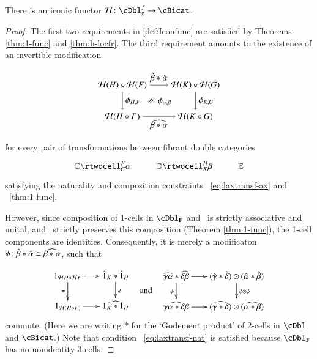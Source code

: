 \begin{thm}\label{thm:h-functor}
  There is an iconic functor $\cH\maps \cDbl^f_g\to \cBicat$.
\end{thm}
\begin{proof}
The first two requirements in \autoref{def:Iconfunc} are satisfied by Theorems \ref{thm:1-func} and \ref{thm:h-locfr}. The third requirement amounts to the existence of an invertible modification

\begin{equation}
\begin{tikzpicture}[xscale=0.75, yscale=1.3]
\node (tl) at (0,2) {${\cH}(H) \circ {\cH}(F)$};
\node (bl) at (0,1) {${\cH}(H \circ F)$};
\node (tr) at (4,2) {${\cH}(K) \circ {\cH}(G)$};
\node (br) at (4,1) {${\cH}(K \circ G)$};
\draw[->] (tl) to node [above] {$\hat{\beta} * \hat{\alpha}$} (tr);
\draw[->] (tr) to node [right] {$\phi_{K,G}$} (br);
\draw[->] (tl) to node [right] {$\phi_{H,F}$} (bl);
\draw[->] (bl) to node [below] {$\widehat{\be*\al}$} (br);
\node at (2,1.5) {$\Arrow{5} \phi_{\alpha,\beta} $};
\end{tikzpicture}
\end{equation}

for every pair of transformations between fibrant double categories
  \[\vcenter{\xymatrix{\lC \rtwocell^F_G{\al} & \lD \rtwocell^H_K{\be}
      & \lE}}\]
satisfying the naturality and composition constraints ~\ref{eq:laxtransf-ax} and ~\ref{thm:1-func}.

However, since composition of
  1-cells in $\cDbl_{\bf F}$ and \cBicat\ is strictly associative and
  unital, and \cH\ strictly preserves this composition (Theorem \ref{thm:1-func}),
  the 1-cell components are identities. Consequently, it is merely  a modificaton $\phi\colon \hat{\beta} * \hat{\alpha} \cong \widehat{\beta*\alpha}$, such that 
 
 \begin{equation}
        \vcenter{\xymatrix@-.5pc{
        1_{{\cH}H \circ {\cH}F} \ar[r]\ar[d]_{=} &
        \hat{1}_{K}*\hat{1}_{H}\ar[d]^{\phi}\\
        1_{{\cH}(H \circ F)}\ar[r] &
        \widehat{1_{K} *1_{H}}}} \quad\text{and}\quad       
    \vcenter{\xymatrix@-.5pc{
        \widehat{\gm\al}*\widehat{\de\be} \ar[r]\ar[d]_\phi &
        (\gmhat*\dehat)\odot(\alhat*\behat)\ar[d]^{\phi \odot \phi}\\
        \widehat{\gm\al*\de\be}\ar[r] &
        (\widehat{\gm*\de})\odot(\widehat{\al*\be})}}
  \end{equation}
commute. (Here we are writing $*$ for the `Godement product' of 2-cells in $\cDbl$ and $\cBicat$.)    
Note that condition ~\ref{eq:laxtransf-nat} is satisfied because $\cDbl_{\bf F}$ has no nonidentity 3-cells.
  

\end{proof}
